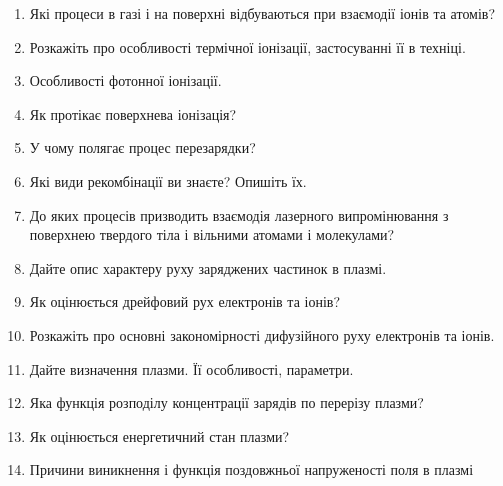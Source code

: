 \documentclass[a4paper,14pt]{extreport}
\begin{document}
\begin{landscape}
\begin{enumerate}
	\item Які процеси в газі і на поверхні відбуваються при взаємодії іонів та атомів?\\
	\texttt{}

	\item Розкажіть про особливості термічної іонізації, застосуванні її в техніці.\\
	\texttt{}

	\item Особливості фотонної іонізації.\\
	\texttt{}

	\item Як протікає поверхнева іонізація?\\
	\texttt{}

	\item У чому полягає процес перезарядки?\\
	\texttt{}

	\item  Які види рекомбінації ви знаєте? Опишіть їх.\\
	\texttt{}

	\item  До яких процесів призводить взаємодія лазерного випромінювання з поверхнею твердого тіла і вільними атомами і молекулами?\\
	\texttt{}

	\item  Дайте опис характеру руху заряджених частинок в плазмі.\\
	\texttt{}

	\item  Як оцінюється дрейфовий рух електронів та іонів?\\
	\texttt{}

	\item Розкажіть про основні закономірності дифузійного руху електронів та іонів.\\
	\texttt{}

	\item Дайте визначення плазми. Її особливості, параметри.\\
	\texttt{}

	\item Яка функція розподілу концентрації зарядів по перерізу плазми?\\
	\texttt{}

	\item  Як оцінюється енергетичний стан плазми?\\
	\texttt{}

	\item  Причини виникнення і функція поздовжньої напруженості поля в плазмі\\
	\texttt{}


\end{enumerate}
\end{landscape}
\end{document}
